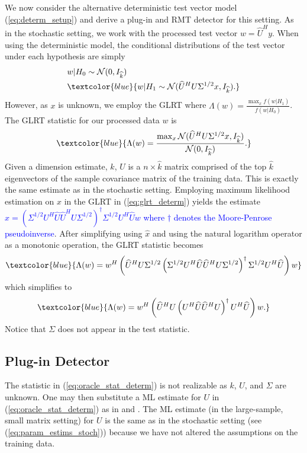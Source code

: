 We now consider the alternative deterministic test vector model (\ref{eq:determ_setup}) and derive a plug-in and RMT detector for this setting. As in the stochastic setting, we work with the processed test vector $w=\widehat{U}^{H}y$. When using the deterministic model, the conditional distributions of the test vector under each hypothesis are simply
\begin{equation*}
\begin{aligned}
&w|H_0\sim\mathcal{N}(0,I_{\widehat{k}})\\
&\textcolor{blue}{w|H_1\sim\mathcal{N}(\widehat{U}^HU\Sigma^{1/2} x, I_{\widehat{k}}).}\\
\end{aligned}
\end{equation*}
However, as $x$ is unknown, we employ the GLRT where $\Lambda(w) = \frac{\max_x f(w|H_1)}{f(w|H_0)}$. The GLRT statistic for our processed data $w$ is
\begin{equation}\label{eq:glrt_determ}
\textcolor{blue}{\Lambda(w)=\frac{\max_x\mathcal{N}(\widehat{U}^HU\Sigma^{1/2} x,I_{\widehat{k}})}{\mathcal{N}(0,I_{\widehat{k}})}.}
\end{equation}
Given a dimension estimate, $\widehat{k}$, $\widehat{U}$ is a $n\times\widehat{k}$ matrix comprised of the top $\widehat{k}$ eigenvectors of the sample covariance matrix of the training data. This is exactly the same estimate as in the stochastic setting. Employing maximum likelihood estimation on $x$ in the GLRT in (\ref{eq:glrt_determ}) yields the estimate \textcolor{blue}{$\widehat{x}=\left(\Sigma^{1/2} U^H\widehat{U}\widehat{U}^HU\Sigma^{1/2}\right)^{\dagger}\Sigma^{1/2} U^H\widehat{U}w$ where $\dagger$ denotes the Moore-Penrose pseudoinverse}. After simplifying using $\widehat{x}$ and using the natural logarithm operator as a monotonic operation, the GLRT statistic becomes
\begin{equation*}
\textcolor{blue}{\Lambda(w) = w^H\left(\widehat{U}^HU\Sigma^{1/2}\left(\Sigma^{1/2} U^H\widehat{U}\widehat{U}^HU\Sigma^{1/2}\right)^{\dagger}\Sigma^{1/2} U^H\widehat{U}\right)w}
\end{equation*}
which simplifies to
\begin{equation}\label{eq:oracle_stat_determ}
\textcolor{blue}{\Lambda(w) = w^H\left(\widehat{U}^HU\left(U^H\widehat{U}\widehat{U}^HU\right)^{\dagger} U^H\widehat{U}\right)w.}
\end{equation}
Notice that $\Sigma$ does not appear in the test statistic.

\subsection{Plug-in Detector}\label{sec:plugin_determ}
The statistic in (\ref{eq:oracle_stat_determ}) is not realizable as $k$, $U$, and $\Sigma$ are unknown. One may then substitute a ML estimate for $U$ in (\ref{eq:oracle_stat_determ}) as in \cite{jin2005cfar} and \cite{mcwhorter2003matched}. The ML estimate (in the large-sample, small matrix setting) for $U$ is the same as in the stochastic setting (see (\ref{eq:param_estims_stoch})) because we have not altered the assumptions on the training data.

